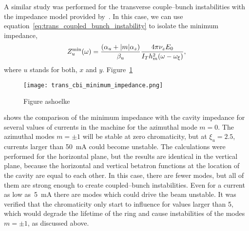     A similar study was performed for the transverse couple--bunch instabilities with the impedance model provided by~. In this case, we can use equation~\eqref{eq:trans_coupled_bunch_instability} to isolate the minimum impedance,
    \begin{align}
        Z_u^\text{min}(\omega) = \frac{\left(\alpha_u + |m|\alpha_z\right)}{\beta_u}\frac{4\pi\nu_zE_0}{I_Th_m^2(\omega-\omega_\xi)},
    \end{align}
    where $u$ stands for both, $x$ and $y$. Figure~\ref{fig:trans_cbi_minimum_impedance}
    \begin{figure}
        \centering
        \texttt{[image: trans\_cbi\_minimum\_impedance.png]}
        \caption{Figure ashoelke}
        \label{fig:trans_cbi_minimum_impedance}
    \end{figure}
    shows the comparison of the minimum impedance with the cavity impedance for several values of currents in the machine for the azimuthal mode $m=0$. The azimuthal modes $m=\pm1$ will be stable at zero chromaticity, but at $\xi_u = 2.5$, currents larger than \SI{50}{\milli\ampere} could become unstable. The calculations were performed for the horizontal plane, but the results are identical in the vertical plane, because the horizontal and vertical betatron functions at the location of the cavity are equal to each other. In this case, there are fewer modes, but all of them are strong enough to create coupled--bunch instabilities. Even for a current as low as~\SI{5}{\milli\ampere} there are modes which could drive the beam unstable. It was verified that the chromaticity only start to influence for values larger than 5, which would degrade the lifetime of the ring and cause instabilities of the modes $m=\pm1$, as discussed above.

